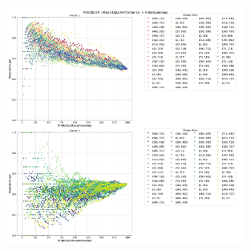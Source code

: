 \documentclass[a4paper,fontsize=8.0pt]{scrartcl}
\begin{document}
\begin{figure}[H]
 \includegraphics[width=0.7\textwidth]{Graphs/TFIDF/user_interaction_vs_model_performance_precision_all_cps_mixed_data_sep_Heterogeneous.pdf}
\end{figure}
\end{document}
